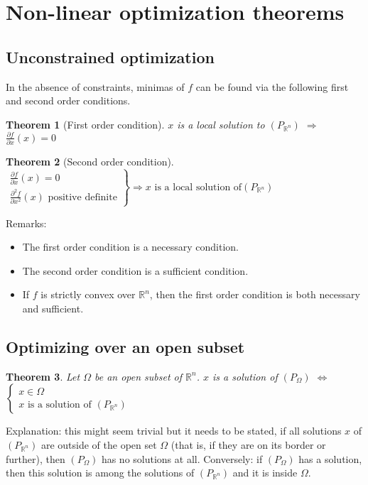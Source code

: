 \documentclass{article}
\newtheorem*{theorem}{Theorem}
\begin{document}
\section{Non-linear optimization theorems}

\subsection{Unconstrained optimization}
In the absence of constraints, minimas of $f$ can be found via the following first and second order conditions.

\begin{theorem}[First order condition]
$x$ is a local solution to $\left(P_{\mathbb{R}^n}\right)$ $\Rightarrow$
$\frac{\partial f}{\partial x}(x) = 0$
\end{theorem}

\begin{theorem}[Second order condition]
\begin{math}
\left.
\begin{array}{l}
\frac{\partial f}{\partial x}(x)=0\\
\frac{\partial^2 f}{\partial x^2}(x) \textrm{ positive definite}
\end{array}\right\} \Rightarrow x \textrm{ is a local solution of
}\left(P_{\mathbb{R}^n}\right)
\end{math}
\end{theorem}

\noindent Remarks:
\begin{itemize}
  \item The first order condition is a necessary condition.
  \item The second order condition is a sufficient condition.
  \item If $f$ is strictly convex over $\mathbb{R}^n$, then the first order condition is both necessary and sufficient.
\end{itemize}


\subsection{Optimizing over an open subset}

\begin{theorem}
Let $\Omega$ be an open subset of $\mathbb{R}^n$. $x$ is a solution of $\left(P_\Omega \right)$ $\Leftrightarrow$ 
\begin{math}
\left\{
\begin{array}{c}
x\in\Omega\\
x\textrm{ is a solution of }(P_{\mathbb{R}^n})
\end{array}\right.
\end{math}
\end{theorem}
\noindent Explanation: this might seem trivial but it needs to be stated, if all solutions $x$ of $(P_{\mathbb{R}^n})$ are outside of the open set $\Omega$ (that is, if they are on its border or further), then $\left(P_\Omega \right)$ has no solutions at all. Conversely: if $\left(P_\Omega \right)$ has a solution, then this solution is among the solutions of $(P_{\mathbb{R}^n})$ and it is inside $\Omega$.
\end{document}
